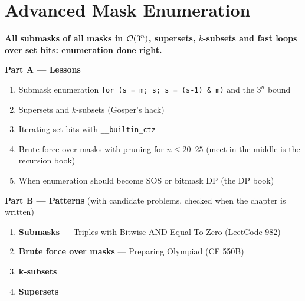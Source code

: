 \chapter{Advanced Mask Enumeration}
\label{ch:mask_enum}

\begin{tcolorbox}[enhanced, colback=white, colframe=secondaryblue, boxrule=1pt, arc=2mm]
\textbf{\large\textcolor{primaryblue}{All submasks of all masks in $\mathcal{O}(3^n)$, supersets, $k$-subsets and fast loops over set bits: enumeration done right.}}
\end{tcolorbox}


\begin{plannedbox}
\textbf{Part A --- Lessons}
\begin{enumerate}[leftmargin=*, label=\textbf{A\arabic*.}, itemsep=1pt]
    \item Submask enumeration \texttt{for (s = m; s; s = (s-1) \& m)} and the $3^n$ bound
    \item Supersets and $k$-subsets (Gosper's hack)
    \item Iterating set bits with \texttt{\_\_builtin\_ctz}
    \item Brute force over masks with pruning for $n \le 20$--$25$ (meet in the middle is the recursion book)
    \item When enumeration should become SOS or bitmask DP (the DP book)
\end{enumerate}
\textbf{Part B --- Patterns} (with candidate problems, checked when the chapter is written)
\begin{enumerate}[leftmargin=*, label=\textbf{P\arabic*.}, itemsep=1pt]
    \item \textbf{Submasks} --- Triples with Bitwise AND Equal To Zero {\small\color{darkgray}(LeetCode 982)}
    \item \textbf{Brute force over masks} --- Preparing Olympiad {\small\color{darkgray}(CF 550B)}
    \item \textbf{k-subsets}
    \item \textbf{Supersets}
\end{enumerate}
\end{plannedbox}
